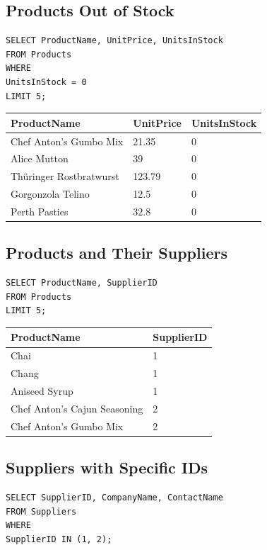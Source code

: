 \documentclass[10pt]{article}
\begin{document}
\subsection{Products Out of Stock}
\begin{verbatim}
SELECT ProductName, UnitPrice, UnitsInStock 
FROM Products 
WHERE 
UnitsInStock = 0
LIMIT 5;
\end{verbatim}

\begin{table}[H]
\begin{tabular}{|l|l|l|}
\hline
ProductName	& UnitPrice	& UnitsInStock \\
\hline
Chef Anton's Gumbo Mix	& 21.35	& 0 \\
Alice Mutton	& 39	& 0 \\
Thüringer Rostbratwurst	& 123.79	& 0 \\
Gorgonzola Telino	& 12.5	& 0 \\
Perth Pasties	& 32.8	& 0 \\
\hline
\end{tabular}
\end{table}


\subsection{Products and Their Suppliers}
\begin{verbatim}
SELECT ProductName, SupplierID 
FROM Products 
LIMIT 5;
\end{verbatim}


\begin{table}[H]
\begin{tabular}{|l|l|}
\hline
ProductName	& SupplierID \\
\hline
Chai	& 1 \\
Chang	& 1 \\
Aniseed Syrup	& 1 \\
Chef Anton's Cajun Seasoning	& 2 \\
Chef Anton's Gumbo Mix	& 2 \\
\hline
\end{tabular}
\end{table}

\subsection{Suppliers with Specific IDs}
\begin{verbatim}
SELECT SupplierID, CompanyName, ContactName 
FROM Suppliers
WHERE 
SupplierID IN (1, 2);
\end{verbatim}
\end{document}
